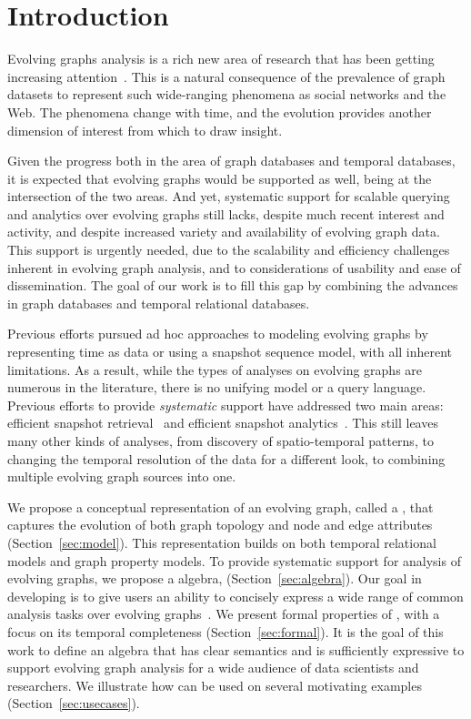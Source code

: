 \section{Introduction}
\label{sec:intro}

Evolving graphs analysis is a rich new area of research that has been
getting increasing
attention~\cite{DBLP:journals/csur/AggarwalS14,Miao2015,Ren2011,Semertzidis2015}.
This is a natural consequence of the prevalence of graph datasets to
represent such wide-ranging phenomena as social networks and the Web.
The phenomena change with time, and the evolution provides another
dimension of interest from which to draw insight.

Given the progress both in the area of graph databases and temporal
databases, it is expected that evolving graphs would be supported as
well, being at the intersection of the two areas.  And yet, systematic
support for scalable querying and analytics over evolving graphs still
lacks, despite much recent interest and activity, and despite increased
variety and availability of evolving graph data.  This support is
urgently needed, due to the scalability and efficiency challenges
inherent in evolving graph analysis, and to considerations of
usability and ease of dissemination.  The goal of our work is to fill
this gap by combining the advances in graph databases and temporal
relational databases.

Previous efforts pursued ad hoc approaches to modeling evolving graphs
by representing time as data or using a snapshot sequence model, with
all inherent limitations.  As a result, while the types of analyses on
evolving graphs are numerous in the literature, there is no unifying
model or a query language.  Previous efforts to provide {\em
  systematic} support have addressed two main areas: efficient
snapshot retrieval~\cite{Khurana2013,Khurana2016} and efficient
snapshot analytics~\cite{Miao2015,MoffittTempWeb16}.  This still
leaves many other kinds of analyses, from discovery of spatio-temporal
patterns, to changing the temporal resolution of the data for a
different look, to combining multiple evolving graph sources into one.

We propose a conceptual representation of an evolving graph, called a
\tg, that captures the evolution of both graph topology and node and
edge attributes (Section~\ref{sec:model}).  This representation builds
on both temporal relational models and graph property models.  To
provide systematic support for analysis of evolving graphs, we propose
a \tg algebra, \tga (Section~\ref{sec:algebra}).  Our goal in
developing \tga is to give users an ability to concisely express a
wide range of common analysis tasks over evolving
graphs~\cite{DBLP:journals/csur/AggarwalS14}.  We present formal
properties of \tga, with a focus on its temporal completeness
(Section~\ref{sec:formal}).  It is the goal of this work to define an
algebra that has clear semantics and is sufficiently expressive to
support evolving graph analysis for a wide audience of data scientists
and researchers.  We illustrate how \tga can be used on several
motivating examples (Section~\ref{sec:usecases}).



